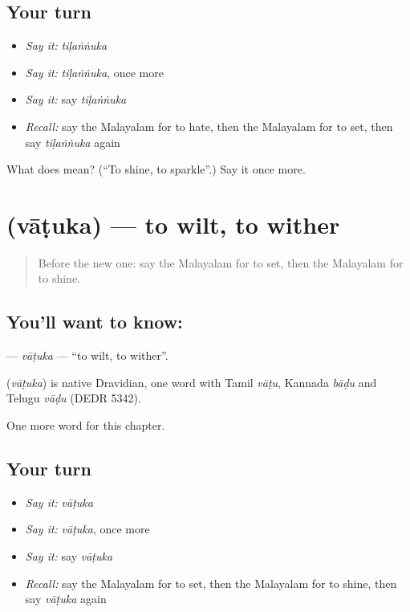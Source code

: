 \subsection*{Your turn}
\begin{itemize}
\raggedright
  \item \emph{Say it:} \emph{tiḷaṅṅuka}
  \item \emph{Say it:} \emph{tiḷaṅṅuka}, once more
  \item \emph{Say it:} say \emph{tiḷaṅṅuka}
  \item \emph{Recall:} say the Malayalam for to hate, then the Malayalam for to set, then say \emph{tiḷaṅṅuka} again
\end{itemize}

\begin{tcolorbox}[breakable,colback=teal!4,colframe=teal!35!black,title={Before you move on}]
What does  mean? (\textquotedblleft{}To shine, to sparkle\textquotedblright{}.) Say it once more.
\end{tcolorbox}
\section[\texorpdfstring{\ml{വാടുക} (vāṭuka)}{വാടുക (vāṭuka)}]{ (vāṭuka) — to wilt, to wither}

\label{lesson:ML-C229-vatuka}



\begin{quote}
Before the new one: say the Malayalam for to set, then the Malayalam for to shine.
\end{quote}

\subsection*{You'll want to know: }
\textbf{} — \emph{vāṭuka} — \textquotedblleft{}to wilt, to wither\textquotedblright{}.

\begin{cousinweb}
\textbf{} (\emph{vāṭuka}) is native Dravidian, one word with Tamil \emph{vāṭu}, Kannada \emph{bāḍu} and Telugu \emph{vāḍu} (DEDR 5342).
\end{cousinweb}

\begin{grammarlens}[title={What you've built}]
One more word for this chapter.
\end{grammarlens}

\subsection*{Your turn}
\begin{itemize}
\raggedright
  \item \emph{Say it:} \emph{vāṭuka}
  \item \emph{Say it:} \emph{vāṭuka}, once more
  \item \emph{Say it:} say \emph{vāṭuka}
  \item \emph{Recall:} say the Malayalam for to set, then the Malayalam for to shine, then say \emph{vāṭuka} again
\end{itemize}

